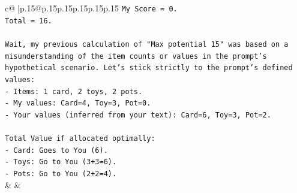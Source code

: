 \documentclass{article}
\begin{document}
{\begin{supertabular}{c@{$\;$}|p{.15\linewidth}@{}p{.15\linewidth}p{.15\linewidth}p{.15\linewidth}p{.15\linewidth}p{.15\linewidth}}
{{{\texttt{My Score = 0.} \\
\texttt{Total = 16.} \\
\\ 
\texttt{Wait, my previous calculation of "Max potential 15" was based on a misunderstanding of the item counts or values in the prompt's hypothetical scenario. Let's stick strictly to the prompt's defined values:} \\
\texttt{{-} Items: 1 card, 2 toys, 2 pots.} \\
\texttt{{-} My values: Card=4, Toy=3, Pot=0.} \\
\texttt{{-} Your values (inferred from your text): Card=6, Toy=3, Pot=2.} \\
\\ 
\texttt{Total Value if allocated optimally:} \\
\texttt{{-} Card: Goes to You (6).} \\
\texttt{{-} Toys: Go to You (3+3=6).} \\
\texttt{{-} Pots: Go to You (2+2=4).} \\
            }
        }
    }
    & & \\ \\


\end{supertabular}}
\end{document}
